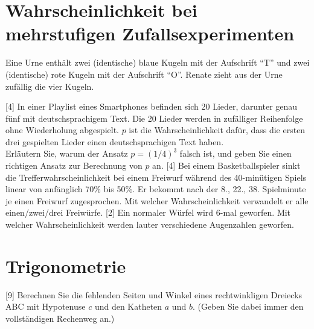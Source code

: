 \documentclass[11pt,letterpaper, onecolumn, addpoints, answers]{exam}
\renewcommand{\thequestion}{\thesection.\arabic{question}}
\theoremstyle{def}
\begin{document}
\begin{questions}
\section{Wahrscheinlichkeit bei mehrstufigen Zufallsexperimenten}
 Eine Urne enthält zwei (identische) blaue Kugeln mit der Aufschrift ``T'' und zwei (identische) rote Kugeln mit der Aufschrift ``O''. Renate zieht aus der Urne zufällig die vier Kugeln. 
[4] In einer Playlist eines Smartphones befinden sich 20 Lieder, darunter genau fünf mit
deutschsprachigem Text. Die 20 Lieder werden in zufälliger Reihenfolge ohne Wiederholung
abgespielt. $p$ ist die Wahrscheinlichkeit dafür, dass die ersten drei gespielten Lieder einen
deutschsprachigen Text haben. \\
Erläutern Sie, warum der Ansatz $p=(1/4)^3$ falsch ist, und geben Sie einen richtigen Ansatz zur Berechnung von $p$ an.
[4] Bei einem Basketballspieler sinkt die Trefferwahrscheinlichkeit bei einem Freiwurf während des 40-minütigen Spiels linear von anfänglich 70\% bis 50\%. Er bekommt nach der 8., 22., 38. Spielminute je einen Freiwurf zugesprochen. Mit welcher Wahrscheinlichkeit verwandelt er alle einen/zwei/drei Freiwürfe.
[2] Ein normaler Würfel wird 6-mal geworfen. Mit welcher Wahrscheinlichkeit werden lauter verschiedene Augenzahlen geworfen.
\pagebreak
\section{Trigonometrie}
[9]
Berechnen Sie die fehlenden Seiten und Winkel eines rechtwinkligen Dreiecks ABC mit Hypotenuse $c$ und den Katheten $a$ und $b$. (Geben Sie dabei immer den vollständigen Rechenweg an.)
\begin{parts}
\begin{multicols}{3}

\end{multicols}
\end{parts}
\end{questions}
\end{document}
